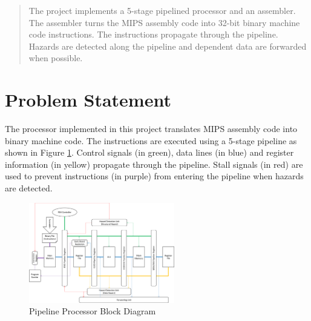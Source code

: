 \documentclass[conference]{IEEEtran}
\begin{document}




\maketitle


\begin{abstract}
The project implements a 5-stage pipelined processor and an assembler. The assembler turns the MIPS assembly code into 32-bit binary machine code instructions. The instructions propagate through the pipeline. Hazards are detected along the pipeline and dependent data are forwarded when possible.
\end{abstract}





%
\IEEEpeerreviewmaketitle



\section{Problem Statement}

The processor implemented in this project translates MIPS assembly code into binary machine code. The instructions are executed using a 5-stage pipeline as shown in Figure \ref{pipelineBD}. Control signals (in green), data lines (in blue) and register information (in yellow) propagate through the pipeline. Stall signals (in red) are used to prevent instructions (in purple) from entering the pipeline when hazards are detected.

\begin{figure}[!h]
\centering
\includegraphics[width=2.5in]{Figures/pipeline}
\caption{Pipeline Processor Block Diagram}
\label{pipelineBD}
\end{figure}
\end{document}
